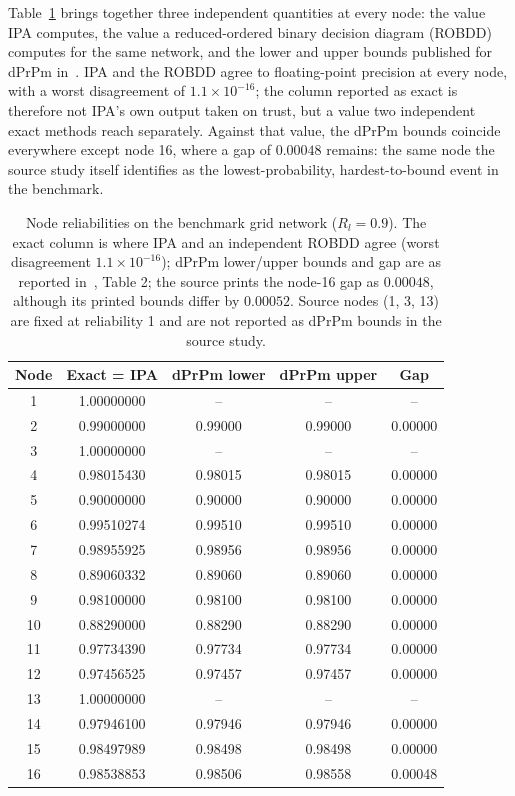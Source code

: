 \documentclass[preprint,12pt]{elsarticle}
\begin{document}
Table~\ref{tab:resultcomparison_grid} brings together three independent quantities at every node: the value IPA computes, the value a reduced-ordered binary decision diagram (ROBDD) computes for the same network, and the lower and upper bounds published for dPrPm in~\cite{tong_probability_2019}. IPA and the ROBDD agree to floating-point precision at every node, with a worst disagreement of $1.1\times10^{-16}$; the column reported as exact is therefore not IPA's own output taken on trust, but a value two independent exact methods reach separately. Against that value, the dPrPm bounds coincide everywhere except node 16, where a gap of $0.00048$ remains: the same node the source study itself identifies as the lowest-probability, hardest-to-bound event in the benchmark.

\begin{table}[!ht]
\centering\small
\caption{Node reliabilities on the benchmark grid network ($R_l=0.9$). The exact column is where IPA and an independent ROBDD agree (worst disagreement $1.1\times10^{-16}$); dPrPm lower/upper bounds and gap are as reported in~\cite{tong_probability_2019}, Table 2; the source prints the node-16 gap as $0.00048$, although its printed bounds differ by $0.00052$. Source nodes (1, 3, 13) are fixed at reliability 1 and are not reported as dPrPm bounds in the source study.}
\label{tab:resultcomparison_grid}
\begin{tabular}{ccccc}
\toprule
Node & Exact = IPA & dPrPm lower & dPrPm upper & Gap \\
\midrule
1  & 1.00000000 & -- & -- & -- \\
2  & 0.99000000 & 0.99000 & 0.99000 & 0.00000 \\
3  & 1.00000000 & -- & -- & -- \\
4  & 0.98015430 & 0.98015 & 0.98015 & 0.00000 \\
5  & 0.90000000 & 0.90000 & 0.90000 & 0.00000 \\
6  & 0.99510274 & 0.99510 & 0.99510 & 0.00000 \\
7  & 0.98955925 & 0.98956 & 0.98956 & 0.00000 \\
8  & 0.89060332 & 0.89060 & 0.89060 & 0.00000 \\
9  & 0.98100000 & 0.98100 & 0.98100 & 0.00000 \\
10 & 0.88290000 & 0.88290 & 0.88290 & 0.00000 \\
11 & 0.97734390 & 0.97734 & 0.97734 & 0.00000 \\
12 & 0.97456525 & 0.97457 & 0.97457 & 0.00000 \\
13 & 1.00000000 & -- & -- & -- \\
14 & 0.97946100 & 0.97946 & 0.97946 & 0.00000 \\
15 & 0.98497989 & 0.98498 & 0.98498 & 0.00000 \\
16 & 0.98538853 & 0.98506 & 0.98558 & 0.00048 \\
\bottomrule
\end{tabular}
\end{table}
\end{document}
